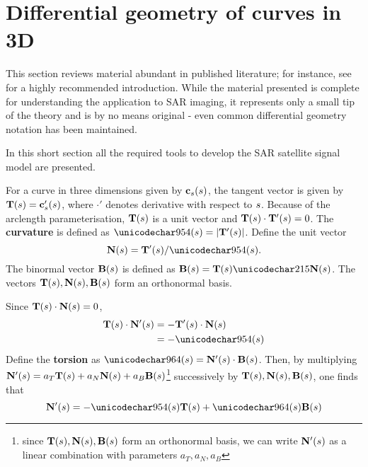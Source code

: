 \section{Differential geometry of curves in 3D}
\label{sc:diffgeoreview}
This section reviews material abundant in published literature; for instance, see \cite{WoodDiffGeo} for a highly recommended introduction. While the material presented is complete for understanding the application to SAR imaging, it represents only a small tip of the theory and is by no means original - even common differential geometry notation has been maintained.
\par
In this short section all the required tools to develop the SAR satellite signal model are presented.
\par
For a curve in three dimensions given by $\mathbf{c}_s(s)$, the tangent vector is given by $\mathbf{T}(s) = \mathbf{c}_s'(s)$, where $\cdot'$ denotes derivative with respect to $s$. Because of the arclength parameterisation, $\mathbf{T}(s)$ is a unit vector and $\mathbf{T}(s)\cdot\mathbf{T}'(s)=0$. The \textbf{curvature} is defined as $\kappa(\parm) =\lvert\vct{T}'(\parm)\rvert$. Define the unit vector 
\begin{equation}
\vct{N}(\parm) = \vct{T}'(\parm)/\kappa(\parm). 
\end{equation}
The binormal vector $\mathbf{B}(s)$ is defined as $\vct{B}(\parm) = \vct{T}(\parm)\times\vct{N}(\parm)$. The vectors $\mathbf{T}(s), \mathbf{N}(s), \mathbf{B}(s)$ form an orthonormal basis.
\par
Since $\mathbf{T}(s)\cdot\mathbf{N}(s)=0$,
\begin{equation}
\begin{split}
 \vct{T}(\parm)\cdot\vct{N}'(\parm)&=-\vct{T}'(\parm)\cdot\vct{N}(\parm)\\
 &=-\kappa(\parm)
\end{split}
\end{equation}
Define the \textbf{torsion} as $\tau(\parm) = \vct{N}'(\parm)\cdot\vct{B}(\parm)$. Then, by multiplying $\mathbf{N}'(s)=a_T\mathbf{T}(s) + a_N\mathbf{N}(s) + a_B\mathbf{B}(s)$\footnote{since $\mathbf{T}(s), \mathbf{N}(s), \mathbf{B}(s)$ form an orthonormal basis, we can write $\mathbf{N}'(s)$ as a linear combination with parameters $a_T, a_N, a_B$} successively by $\mathbf{T}(s),\mathbf{N}(s),\mathbf{B}(s)$, one finds that
\begin{equation}
 \vct{N}'(\parm) = -\kappa(\parm)\vct{T}(\parm)+\tau(\parm)\vct{B}(\parm)
\end{equation}
